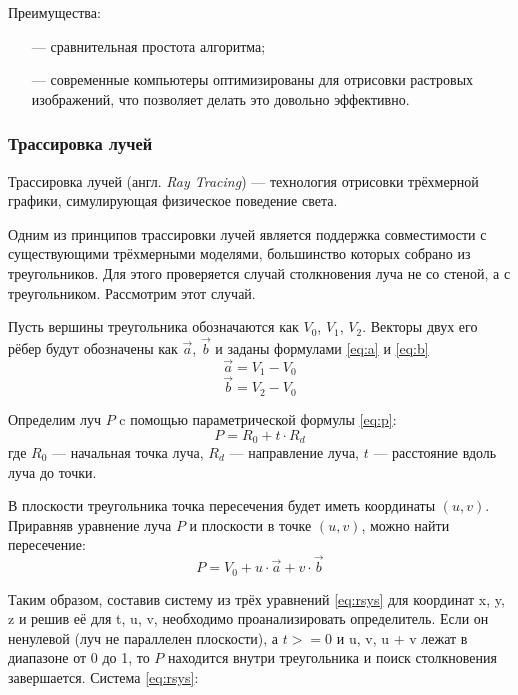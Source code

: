 Преимущества:
\begin{itemize}[leftmargin=1.6\parindent]
	\item[---] сравнительная простота алгоритма;
	\item[---] современные компьютеры оптимизированы для отрисовки растровых 
	изображений, что позволяет делать это довольно эффективно.
\end{itemize}

\subsubsection{Трассировка лучей}
Трассировка лучей (англ. \textit{Ray Tracing}) \cite{raytracing} --- технология отрисовки 
трёхмерной графики, симулирующая физическое поведение света. 

Одним из принципов трассировки лучей является поддержка 
совместимости с существующими трёхмерными моделями, большинство 
которых собрано из треугольников.
Для этого проверяется случай столкновения 
луча не со стеной, а с треугольником.
Рассмотрим этот случай.

Пусть вершины треугольника обозначаются как $V_0$, $V_1$, $V_2$. 
Векторы  двух его рёбер будут обозначены как $\vec{a}$, $\vec{b}$ и заданы формулами \ref{eq:a} и \ref{eq:b}
\begin{equation}
	\vec{a} = V_1 - V_0
	\label{eq:a}
\end{equation}
\begin{equation}
	\vec{b} = V_2 - V_0
	\label{eq:b}
\end{equation}

Определим луч $P$ c помощью параметрической формулы \ref{eq:p}:
\begin{equation}
	P= R_0 + t \cdot R_d
	\label{eq:p}
\end{equation}
где $R_0$ --- начальная точка луча, $R_d$ --- направление луча, $t$ --- расстояние вдоль луча до точки.

В плоскости треугольника точка пересечения будет иметь координаты $(u, v)$. Приравняв уравнение луча $P$ и плоскости в точке $(u, v)$, можно найти пересечение:
\begin{equation}
	P= V_0 + u \cdot \vec{a} + v \cdot \vec{b}
	\label{eq:p2}
\end{equation}

Таким образом, составив систему из трёх уравнений \ref{eq:rsys} для координат x, y, z и решив её для t, u, v, необходимо проанализировать определитель. Если 
он ненулевой (луч не параллелен плоскости), а $ t >= 0$ и u, v, u + v лежат в диапазоне от 0 до 1, то $P$ находится внутри треугольника и поиск столкновения завершается. Система \ref{eq:rsys}:

